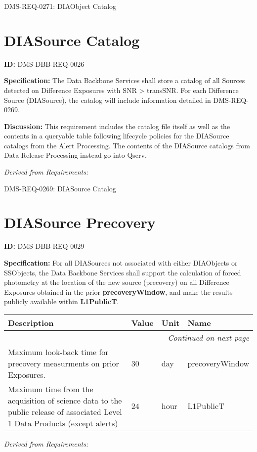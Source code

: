 \documentclass[SE,toc,lsstdraft]{lsstdoc}
\makeatletter
\newcommand{\paramname}[1]{\hspace{0pt}#1}
\newcommand{\unitname}[1]{\hspace{0pt}#1}
\newenvironment{parameters}[0]{%
\setlength\LTleft{0pt}
\setlength\LTright{\fill}
\begin{small}
\begin{longtable}[]{|p{0.49\textwidth}|l|p{0.6in}|p{1.70in}@{}|}

\hline \textbf{Description} & \textbf{Value} & \textbf{Unit} & \textbf{Name} \\ \hline
\endhead

\hline \multicolumn{4}{r}{\emph{Continued on next page}} \\
\endfoot

\hline\hline
\endlastfoot
}{%
\hline
\end{longtable}
\end{small}
}
\makeatother
\begin{document}
DMS-REQ-0271:
DIAObject Catalog \newline

\section{DIASource Catalog}

\label{DMS-DBB-REQ-0026}
\textbf{ID:} DMS-DBB-REQ-0026

\textbf{Specification:}
The Data Backbone Services shall store a catalog of all Sources detected on Difference Exposures with SNR > transSNR.   For each Difference Source (DIASource), the catalog will include information detailed in DMS-REQ-0269.

\textbf{Discussion:}
This requirement includes the catalog file itself as well as the contents in a queryable table following lifecycle policies for the DIASource catalogs from the Alert Processing.  The contents of the DIASource catalogs from Data Release Processing instead go into Qserv.

\emph{Derived from Requirements:}

DMS-REQ-0269:
DIASource Catalog \newline

\section{DIASource Precovery}

\label{DMS-DBB-REQ-0029}
\textbf{ID:} DMS-DBB-REQ-0029

\textbf{Specification:}
For all DIASources not associated with either DIAObjects or SSObjects, the Data Backbone Services shall support the calculation of forced photometry at the location of the new source (precovery) on all Difference Exposures obtained in the prior \textbf{precoveryWindow}, and make the results publicly available within \textbf{L1PublicT}.

\begin{parameters}
Maximum look-back time for precovery measurments on prior Exposures.
&
30
&
\unitname{%
day
}
&
\paramname{%
precoveryWindow
} \\\hline
Maximum time from the acquisition of science data to the public release of associated Level 1 Data Products (except alerts)
&
24
&
\unitname{%
hour
}
&
\paramname{%
L1PublicT
} \\\hline
\end{parameters}

\emph{Derived from Requirements:}
\end{document}
